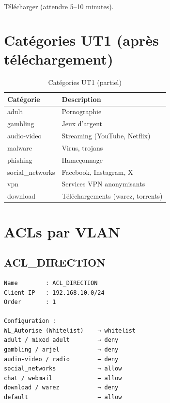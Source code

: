 Télécharger (attendre 5–10 minutes).

\section{Catégories UT1 (après téléchargement)}

\begin{table}[H]
    \centering
    \begin{tabularx}{\textwidth}{|l|p{4cm}|}
        \hline
        \textbf{Catégorie} & \textbf{Description} \\
        \hline
        adult & Pornographie \\
        \hline
        gambling & Jeux d'argent \\
        \hline
        audio-video & Streaming (YouTube, Netflix) \\
        \hline
        malware & Virus, trojans \\
        \hline
        phishing & Hameçonnage \\
        \hline
        social\_networks & Facebook, Instagram, X \\
        \hline
        vpn & Services VPN anonymisants \\
        \hline
        download & Téléchargements (warez, torrents) \\
        \hline
    \end{tabularx}
    \caption{Catégories UT1 (partiel)}
    \label{tab:ut1-categories}
\end{table}

\section{ACLs par VLAN}

\subsection{ACL\_DIRECTION}

\begin{lstlisting}
Name        : ACL_DIRECTION
Client IP   : 192.168.10.0/24
Order       : 1

Configuration :
WL_Autorise (Whitelist)    → whitelist
adult / mixed_adult        → deny
gambling / arjel           → deny
audio-video / radio        → deny
social_networks            → allow
chat / webmail             → allow
download / warez           → deny
default                    → allow
\end{lstlisting}

